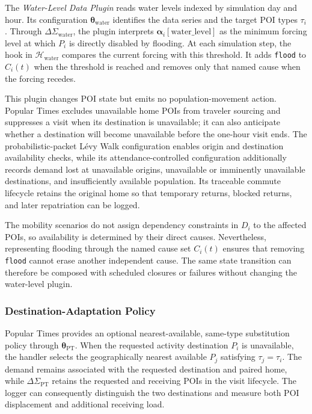 The \textit{Water-Level Data Plugin} reads water levels indexed by simulation day and hour. Its configuration $\bm{\theta}_{\mathrm{water}}$ identifies the data series and the target POI types $\tau_i$. Through $\Delta\Sigma_{\mathrm{water}}$, the plugin interprets $\bm{\alpha}_i[\mathrm{water\_level}]$ as the minimum forcing level at which $P_i$ is directly disabled by flooding. At each simulation step, the hook in $\mathcal{H}_{\mathrm{water}}$ compares the current forcing with this threshold. It adds \texttt{flood} to $C_i(t)$ when the threshold is reached and removes only that named cause when the forcing recedes.

This plugin changes POI state but emits no population-movement action. Popular Times excludes unavailable home POIs from traveler sourcing and suppresses a visit when its destination is unavailable; it can also anticipate whether a destination will become unavailable before the one-hour visit ends. The probabilistic-packet L\'evy Walk configuration enables origin and destination availability checks, while its attendance-controlled configuration additionally records demand lost at unavailable origins, unavailable or imminently unavailable destinations, and insufficiently available population. Its traceable commute lifecycle retains the original home so that temporary returns, blocked returns, and later repatriation can be logged.

The mobility scenarios do not assign dependency constraints in $D_i$ to the affected POIs, so availability is determined by their direct causes. Nevertheless, representing flooding through the named cause set $C_i(t)$ ensures that removing \texttt{flood} cannot erase another independent cause. The same state transition can therefore be composed with scheduled closures or failures without changing the water-level plugin.

\subsubsection{Destination-Adaptation Policy}

Popular Times provides an optional nearest-available, same-type substitution policy through $\bm{\theta}_{\mathrm{PT}}$. When the requested activity destination $P_i$ is unavailable, the handler selects the geographically nearest available $P_j$ satisfying $\tau_j=\tau_i$. The demand remains associated with the requested destination and paired home, while $\Delta\Sigma_{\mathrm{PT}}$ retains the requested and receiving POIs in the visit lifecycle. The logger can consequently distinguish the two destinations and measure both POI displacement and additional receiving load.


